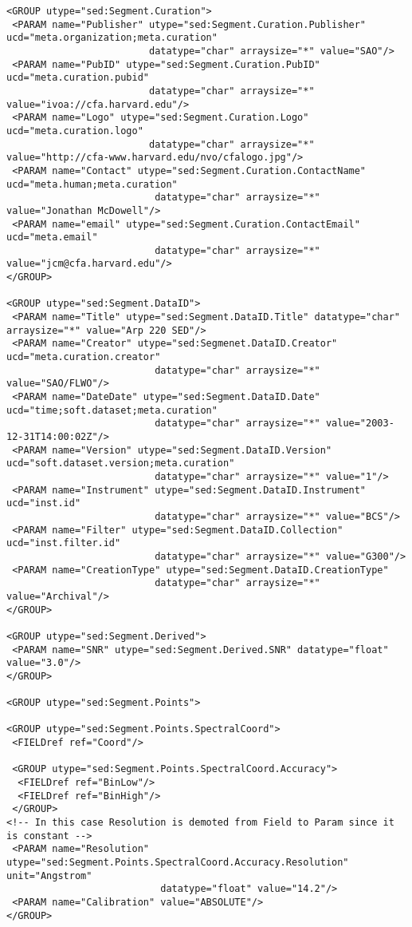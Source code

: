 \documentclass[11pt]{article}
\newenvironment{fmpage}
     {\begin{lrbox}{\fmbox}\begin{minipage}{6.5in}}
     {\end{minipage}\end{lrbox}\colorbox{iblue}{\fbox{\usebox{\fmbox}}}}
\begin{document}
{\begin{flushleft}
\begin{fmpage}
\begin{verbatim}
<GROUP utype="sed:Segment.Curation">
 <PARAM name="Publisher" utype="sed:Segment.Curation.Publisher" ucd="meta.organization;meta.curation" 
                         datatype="char" arraysize="*" value="SAO"/>
 <PARAM name="PubID" utype="sed:Segment.Curation.PubID" ucd="meta.curation.pubid" 
                         datatype="char" arraysize="*" value="ivoa://cfa.harvard.edu"/>
 <PARAM name="Logo" utype="sed:Segment.Curation.Logo" ucd="meta.curation.logo" 
                         datatype="char" arraysize="*" value="http://cfa-www.harvard.edu/nvo/cfalogo.jpg"/>
 <PARAM name="Contact" utype="sed:Segment.Curation.ContactName" ucd="meta.human;meta.curation" 
                          datatype="char" arraysize="*" value="Jonathan McDowell"/>
 <PARAM name="email" utype="sed:Segment.Curation.ContactEmail" ucd="meta.email" 
                          datatype="char" arraysize="*" value="jcm@cfa.harvard.edu"/>
</GROUP>

<GROUP utype="sed:Segment.DataID">
 <PARAM name="Title" utype="sed:Segment.DataID.Title" datatype="char" arraysize="*" value="Arp 220 SED"/>
 <PARAM name="Creator" utype="sed:Segmenet.DataID.Creator" ucd="meta.curation.creator" 
                          datatype="char" arraysize="*" value="SAO/FLWO"/>
 <PARAM name="DateDate" utype="sed:Segment.DataID.Date" ucd="time;soft.dataset;meta.curation" 
                          datatype="char" arraysize="*" value="2003-12-31T14:00:02Z"/>
 <PARAM name="Version" utype="sed:Segment.DataID.Version" ucd="soft.dataset.version;meta.curation" 
                          datatype="char" arraysize="*" value="1"/>
 <PARAM name="Instrument" utype="sed:Segment.DataID.Instrument" ucd="inst.id" 
                          datatype="char" arraysize="*" value="BCS"/>
 <PARAM name="Filter" utype="sed:Segment.DataID.Collection" ucd="inst.filter.id" 
                          datatype="char" arraysize="*" value="G300"/>
 <PARAM name="CreationType" utype="sed:Segment.DataID.CreationType" 
                          datatype="char" arraysize="*" value="Archival"/>
</GROUP>

<GROUP utype="sed:Segment.Derived">
 <PARAM name="SNR" utype="sed:Segment.Derived.SNR" datatype="float" value="3.0"/>
</GROUP>

<GROUP utype="sed:Segment.Points">

<GROUP utype="sed:Segment.Points.SpectralCoord">
 <FIELDref ref="Coord"/>

 <GROUP utype="sed:Segment.Points.SpectralCoord.Accuracy">
  <FIELDref ref="BinLow"/>
  <FIELDref ref="BinHigh"/>
 </GROUP>
<!-- In this case Resolution is demoted from Field to Param since it is constant -->
 <PARAM name="Resolution" utype="sed:Segment.Points.SpectralCoord.Accuracy.Resolution" unit="Angstrom" 
                           datatype="float" value="14.2"/>
 <PARAM name="Calibration" value="ABSOLUTE"/>
</GROUP>


\end{verbatim}
\end{fmpage}
\end{flushleft}}
\end{document}
